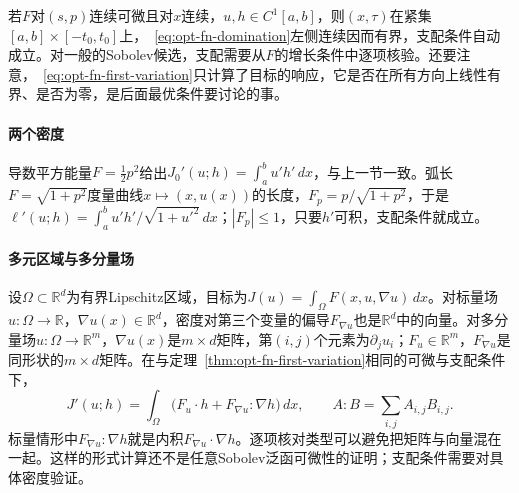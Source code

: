 若$F$对$(s,p)$连续可微且对$x$连续，$u,h\in C^1[a,b]$，则$(x,\tau)$在紧集$[a,b]\times[-t_0,t_0]$上，~\eqref{eq:opt-fn-domination}左侧连续因而有界，支配条件自动成立。对一般的Sobolev候选，支配需要从$F$的增长条件中逐项核验。还要注意，~\eqref{eq:opt-fn-first-variation}只计算了目标的响应，它是否在所有方向上线性有界、是否为零，是后面最优条件要讨论的事。

\paragraph{两个密度}
导数平方能量$F=\frac12p^2$给出$J_0'(u;h)=\int_a^bu'h'\,dx$，与上一节一致。弧长$F=\sqrt{1+p^2}$度量曲线$x\mapsto(x,u(x))$的长度，$F_p=p/\sqrt{1+p^2}$，于是$\ell'(u;h)=\int_a^bu'h'/\sqrt{1+u'^2}\,dx$；$|F_p|\le1$，只要$h'$可积，支配条件就成立。

\paragraph{多元区域与多分量场}
设$\Omega\subset\mathbb R^d$为有界Lipschitz区域，目标为$J(u)=\int_\Omega F(x,u,\nabla u)\,dx$。对标量场$u:\Omega\to\mathbb R$，$\nabla u(x)\in\mathbb R^d$，密度对第三个变量的偏导$F_{\nabla u}$也是$\mathbb R^d$中的向量。对多分量场$u:\Omega\to\mathbb R^m$，$\nabla u(x)$是$m\times d$矩阵，第$(i,j)$个元素为$\partial_ju_i$；$F_u\in\mathbb R^m$，$F_{\nabla u}$是同形状的$m\times d$矩阵。在与定理~\ref{thm:opt-fn-first-variation}相同的可微与支配条件下，
\[
 J'(u;h)=\int_\Omega\bigl(F_u\cdot h+F_{\nabla u}:\nabla h\bigr)\,dx,\qquad A:B=\sum_{i,j}A_{i,j}B_{i,j} .
\]
标量情形中$F_{\nabla u}:\nabla h$就是内积$F_{\nabla u}\cdot\nabla h$。逐项核对类型可以避免把矩阵与向量混在一起。这样的形式计算还不是任意Sobolev泛函可微性的证明；支配条件需要对具体密度验证。

